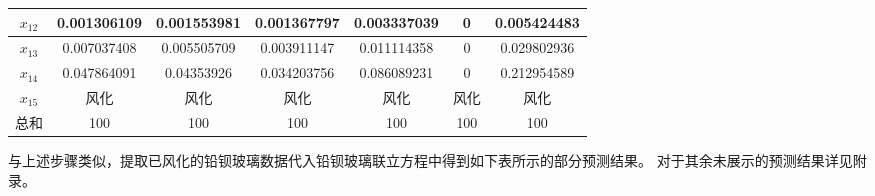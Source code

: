 \documentclass[UTF8]{ctexart}
\begin{document}
\begin{table}[H]
\begin{tabular}{|c|c|c|c|c|c|c|}
                        $x_{12}$   & 0.001306109 & 0.001553981 & 0.001367797 & 0.003337039 & 0     & 0.005424483 \\ \hline
                        $x_{13}$   & 0.007037408 & 0.005505709 & 0.003911147 & 0.011114358 & 0     & 0.029802936 \\ \hline
                        $x_{14}$   & 0.047864091 & 0.04353926  & 0.034203756 & 0.086089231 & 0     & 0.212954589 \\ \hline
                        $x_{15}$   & 风化        & 风化        & 风化        & 风化        & 风化  & 风化        \\ \hline
                        总和       & 100         & 100         & 100         & 100         & 100   & 100         \\ \hline
                    \end{tabular}
                \end{table}

                与上述步骤类似，提取已风化的铅钡玻璃数据代入铅钡玻璃联立方程中得到如下表所示的部分预测结果。
                对于其余未展示的预测结果详见附录。
\end{document}
